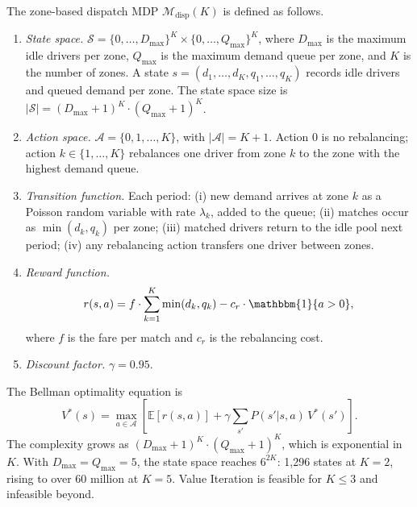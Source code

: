 \begin{definition}
\label{def:dispatch_mdp}
The zone-based dispatch MDP $\mathcal{M}_{\mathrm{disp}}(K)$ is defined as follows.
\begin{enumerate}
    \item \emph{State space.} $\mathcal{S} = \{0, \ldots, D_{\max}\}^K \times \{0, \ldots, Q_{\max}\}^K$, where $D_{\max}$ is the maximum idle drivers per zone, $Q_{\max}$ is the maximum demand queue per zone, and $K$ is the number of zones. A state $s = (d_1, \ldots, d_K, q_1, \ldots, q_K)$ records idle drivers and queued demand per zone. The state space size is $|\mathcal{S}| = (D_{\max}+1)^K \cdot (Q_{\max}+1)^K$.
    \item \emph{Action space.} $\mathcal{A} = \{0, 1, \ldots, K\}$, with $|\mathcal{A}| = K + 1$. Action $0$ is no rebalancing; action $k \in \{1, \ldots, K\}$ rebalances one driver from zone $k$ to the zone with the highest demand queue.
    \item \emph{Transition function.} Each period: (i) new demand arrives at zone $k$ as a Poisson random variable with rate $\lambda_k$, added to the queue; (ii) matches occur as $\min(d_k, q_k)$ per zone; (iii) matched drivers return to the idle pool next period; (iv) any rebalancing action transfers one driver between zones.
    \item \emph{Reward function.}
    \begin{equation}
    \label{eq:dispatch_reward}
    r(s, a) = f \cdot \sum_{k=1}^{K} \min(d_k, q_k) - c_r \cdot \mathbbm{1}\{a > 0\},
    \end{equation}
    where $f$ is the fare per match and $c_r$ is the rebalancing cost.
    \item \emph{Discount factor.} $\gamma = 0.95$.
\end{enumerate}
\end{definition}

The Bellman optimality equation is
\begin{equation}
\label{eq:dispatch_bellman}
V^*(s) = \max_{a \in \mathcal{A}} \left[ \mathbb{E}[r(s,a)] + \gamma \sum_{s'} P(s' | s, a) \, V^*(s') \right].
\end{equation}
The complexity grows as $(D_{\max}+1)^K \cdot (Q_{\max}+1)^K$, which is exponential in $K$. With $D_{\max} = Q_{\max} = 5$, the state space reaches $6^{2K}$: 1,296 states at $K = 2$, rising to over 60 million at $K = 5$. Value Iteration is feasible for $K \leq 3$ and infeasible beyond.

